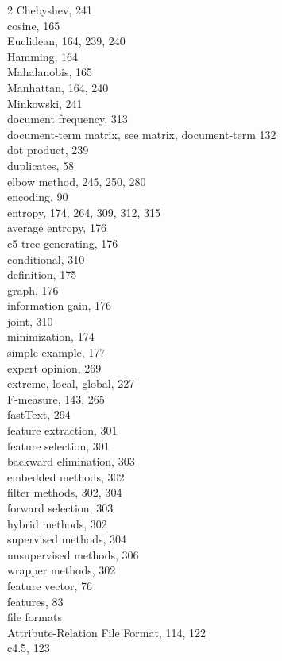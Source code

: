 \documentclass[11pt,openany,executivepaper]{book}
\begin{document}
\begin{multicols}{2}
Chebyshev, 241\\
cosine, 165\\
Euclidean, 164, 239, 240\\
Hamming, 164\\
Mahalanobis, 165\\
Manhattan, 164, 240\\
Minkowski, 241\\
document frequency, 313\\
document-term matrix, see matrix, document-term 132\\
dot product, 239\\
duplicates, 58\\
elbow method, 245, 250, 280\\
encoding, 90\\
entropy, 174, 264, 309, 312, 315\\
average entropy, 176\\
c5 tree generating, 176\\
conditional, 310\\
definition, 175\\
graph, 176\\
information gain, 176\\
joint, 310\\
minimization, 174\\
simple example, 177\\
expert opinion, 269\\
extreme, local, global, 227\\
F-measure, 143, 265\\
fastText, 294\\
feature extraction, 301\\
feature selection, 301\\
backward elimination, 303\\
embedded methods, 302\\
filter methods, 302, 304\\
forward selection, 303\\
hybrid methods, 302\\
supervised methods, 304\\
unsupervised methods, 306\\
wrapper methods, 302\\
feature vector, 76\\
features, 83\\
file formats\\
Attribute-Relation File Format, 114, 122\\
c4.5, 123\\

\end{multicols}
\end{document}
